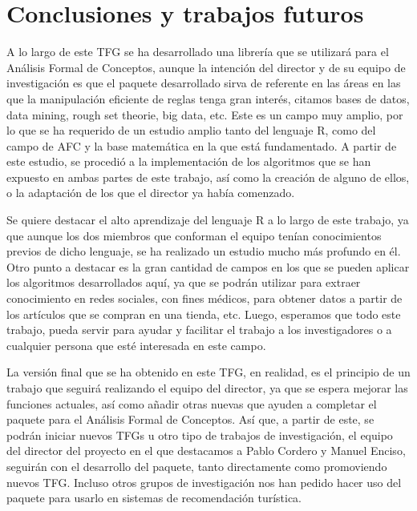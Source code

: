\section{Conclusiones y trabajos futuros}

A lo largo de este TFG se ha desarrollado una librer\'ia que se utilizar\'a para el An\'alisis Formal de Conceptos, aunque la intenci\'on 
del director y de su equipo de investigaci\'on es que el paquete desarrollado sirva de referente en las \'areas en las que la manipulaci\'on 
eficiente de reglas tenga gran inter\'es, citamos bases de datos, data mining, rough set theorie, big data, etc. Este es un 
campo muy amplio, por lo que se ha requerido de un estudio amplio tanto del lenguaje R, como del campo de AFC y la base matem\'atica en la que 
est\'a fundamentado. A partir de este estudio, se procedi\'o a la implementaci\'on de los algoritmos que se han expuesto en ambas partes de 
este trabajo, as\'i como la creaci\'on de alguno de ellos, o la adaptaci\'on de los que el director ya hab\'ia comenzado.

Se quiere destacar el alto aprendizaje del lenguaje R a lo largo de este trabajo, ya que aunque los dos miembros que conforman el equipo ten\'ian 
conocimientos previos de dicho lenguaje, se ha realizado un estudio mucho m\'as profundo en \'el.
Otro punto a destacar es la gran cantidad de campos en los que se pueden aplicar los algoritmos desarrollados aqu\'i, ya que se podr\'an 
utilizar para extraer conocimiento en redes sociales, con fines m\'edicos, para obtener datos a partir de los art\'iculos que se compran 
en una tienda, etc. Luego, esperamos que todo este trabajo, pueda servir para ayudar y facilitar el trabajo a los investigadores o a cualquier persona 
que est\'e interesada en este campo.

La versi\'on final que se ha obtenido en este TFG, en realidad, es el principio de un trabajo que seguir\'a realizando el equipo del 
director, ya que se espera mejorar las funciones actuales, as\'i como a\~nadir otras nuevas 
que ayuden a completar el paquete para el An\'alisis Formal de Conceptos. As\'i que, a partir de este, se podr\'an iniciar nuevos TFGs u otro 
tipo de trabajos de investigaci\'on, el equipo del director del proyecto en el que destacamos a Pablo Cordero y Manuel Enciso, seguir\'an 
con el desarrollo del paquete, tanto directamente como promoviendo nuevos TFG. Incluso otros grupos de investigaci\'on nos han pedido 
hacer uso del paquete para usarlo en sistemas de recomendaci\'on tur\'istica.

